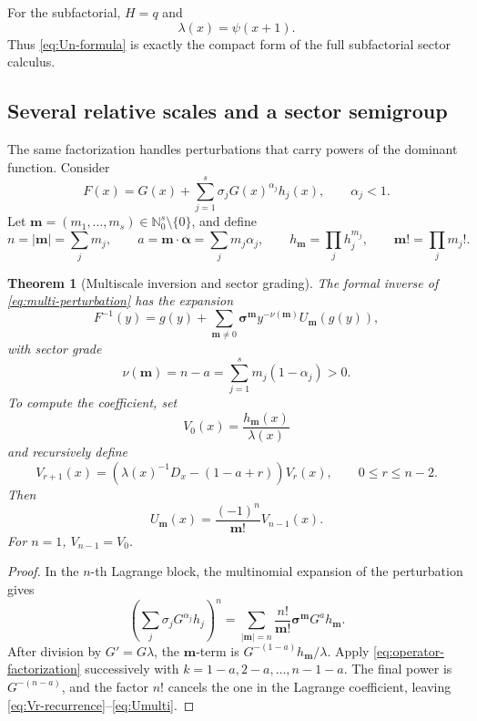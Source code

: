 \documentclass[11pt,oneside]{article}
\theoremstyle{plain}
\newtheorem{theorem}{Theorem}[section]
\theoremstyle{definition}
\theoremstyle{remark}
\newcommand{\N}{\mathbb{N}}
\newcommand{\abs}[1]{\left\lvert#1\right\rvert}
\begin{document}
For the subfactorial, \(H=q\) and
\begin{equation}
 \lambda(x)=\psi(x+1).
 \label{eq:lambda-subfactorial}
\end{equation}
Thus \eqref{eq:Un-formula} is exactly the compact form of the full
subfactorial sector calculus.

\subsection{Several relative scales and a sector semigroup}

The same factorization handles perturbations that carry powers of the
dominant function.  Consider
\begin{equation}
 F(x)=G(x)+\sum_{j=1}^{s}\sigma_jG(x)^{\alpha_j}h_j(x),
 \qquad \alpha_j<1.
 \label{eq:multi-perturbation}
\end{equation}
Let \(\bm m=(m_1,\ldots,m_s)\in\N_0^s\setminus\{0\}\), and define
\begin{equation}
 n=\abs{\bm m}=\sum_jm_j,
 \qquad
 a=\bm m\!\cdot\!\bm\alpha=\sum_jm_j\alpha_j,
 \qquad
 h_{\bm m}=\prod_jh_j^{m_j},
 \qquad
 \bm m!=\prod_jm_j!.
 \label{eq:multiindex-defs}
\end{equation}

\begin{theorem}[Multiscale inversion and sector grading]
\label{thm:multiscale}
The formal inverse of \eqref{eq:multi-perturbation} has the expansion
\begin{equation}
 F^{-1}(y)=g(y)+
 \sum_{\bm m\ne0}\bm\sigma^{\bm m}
 y^{-\nu(\bm m)}U_{\bm m}(g(y)),
 \label{eq:multiscale-inverse}
\end{equation}
with sector grade
\begin{equation}
 \boxed{\quad
 \nu(\bm m)=n-a=\sum_{j=1}^{s}m_j(1-\alpha_j)>0.
 \quad}
 \label{eq:sector-grade}
\end{equation}
To compute the coefficient, set
\begin{equation}
 V_0(x)=\frac{h_{\bm m}(x)}{\lambda(x)}
 \label{eq:V0}
\end{equation}
and recursively define
\begin{equation}
 V_{r+1}(x)=
 \left(\lambda(x)^{-1}D_x-(1-a+r)\right)V_r(x),
 \qquad 0\le r\le n-2.
 \label{eq:Vr-recurrence}
\end{equation}
Then
\begin{equation}
 \boxed{\quad
 U_{\bm m}(x)=\frac{(-1)^n}{\bm m!}V_{n-1}(x).
 \quad}
 \label{eq:Umulti}
\end{equation}
For \(n=1\), \(V_{n-1}=V_0\).
\end{theorem}
\begin{proof}
In the \(n\)-th Lagrange block, the multinomial expansion of the perturbation
gives
\[
 \left(\sum_j\sigma_jG^{\alpha_j}h_j\right)^n
 =\sum_{\abs{\bm m}=n}\frac{n!}{\bm m!}
 \bm\sigma^{\bm m}G^a h_{\bm m}.
\]
After division by \(G'=G\lambda\), the \(\bm m\)-term is
\(G^{-(1-a)}h_{\bm m}/\lambda\).  Apply
\eqref{eq:operator-factorization} successively with
\(k=1-a,2-a,\ldots,n-1-a\).  The final power is
\(G^{-(n-a)}\), and the factor \(n!\) cancels the one in the Lagrange
coefficient, leaving \eqref{eq:Vr-recurrence}--\eqref{eq:Umulti}.
\end{proof}
\end{document}
